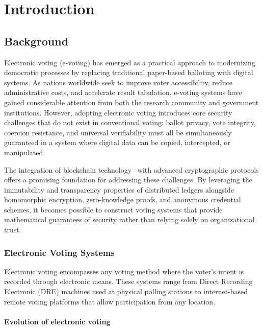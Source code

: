 \chapter{Introduction}
\label{ch:introduction}

\section{Background}
\label{sec:background}

Electronic voting (e-voting) has emerged as a practical approach to modernizing democratic processes by replacing traditional paper-based balloting with digital systems. As nations worldwide seek to improve voter accessibility, reduce administrative costs, and accelerate result tabulation, e-voting systems have gained considerable attention from both the research community and government institutions. However, adopting electronic voting introduces core security challenges that do not exist in conventional voting: ballot privacy, vote integrity, coercion resistance, and universal verifiability must all be simultaneously guaranteed in a system where digital data can be copied, intercepted, or manipulated.

The integration of blockchain technology~\cite{nakamoto2008} with advanced cryptographic protocols offers a promising foundation for addressing these challenges. By leveraging the immutability and transparency properties of distributed ledgers alongside homomorphic encryption, zero-knowledge proofs, and anonymous credential schemes, it becomes possible to construct voting systems that provide mathematical guarantees of security rather than relying solely on organizational trust.

\subsection{Electronic Voting Systems}
\label{subsec:evoting-systems}

Electronic voting encompasses any voting method where the voter's intent is recorded through electronic means. These systems range from Direct Recording Electronic (DRE) machines used at physical polling stations to internet-based remote voting platforms that allow participation from any location.

\subsubsection{Evolution of electronic voting}
\label{subsubsec:evolution}

